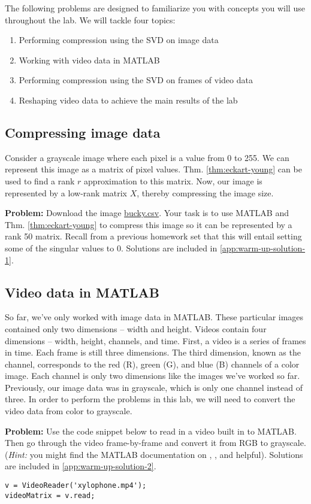 The following problems are designed to familiarize you with concepts you will use throughout the lab. We will tackle four topics:
\begin{enumerate}
	\item Performing compression using the SVD on image data
	\item Working with video data in MATLAB
	\item Performing compression using the SVD on frames of video data
	\item Reshaping video data to achieve the main results of the lab
\end{enumerate}

\subsection{Compressing image data}
 Consider a grayscale image where each pixel is a value from 0 to 255. We can represent this image as a matrix of pixel values. Thm. \ref{thm:eckart-young} can be used to find a rank $r$ approximation to this matrix. Now, our image is represented by a low-rank matrix $X$, thereby compressing the image size.

\textbf{Problem:} Download the image \href{http://www.laurentlessard.com/teaching/ece532/homework/bucky.csv}{bucky.csv}. Your task is to use MATLAB and Thm. \ref{thm:eckart-young} to compress this image so it can be represented by a rank 50 matrix. Recall from a previous homework set that this will entail setting some of the singular values to 0. Solutions are included in \ref{app:warm-up-solution-1}.

\subsection{Video data in MATLAB}
So far, we've only worked with image data in MATLAB. These particular images contained only two dimensions -- width and height. Videos contain four dimensions -- width, height, channels, and time. First, a video is a series of frames in time. Each frame is still three dimensions. The third dimension, known as the channel, corresponds to the red (R), green (G), and blue (B) channels of a color image. Each channel is only two dimensions like the images we've worked so far. Previously, our image data was in grayscale, which is only one channel instead of three. In order to perform the problems in this lab, we will need to convert the video data from color to grayscale.

\textbf{Problem:} Use the code snippet below to read in a video built in to MATLAB. Then go through the video frame-by-frame and convert it from RGB to grayscale. (\textit{Hint:} you might find the MATLAB documentation on , , and  helpful). Solutions are included in \ref{app:warm-up-solution-2}.
\begin{lstlisting}[style=code]
v = VideoReader('xylophone.mp4');
videoMatrix = v.read;
\end{lstlisting}

